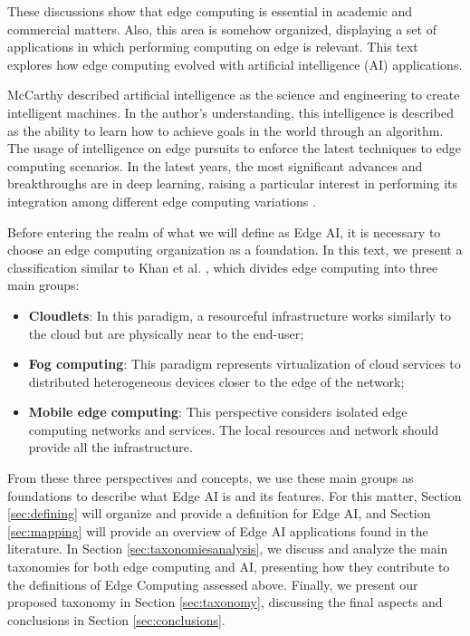 These discussions show that edge computing is essential in academic and commercial matters. Also, this area is somehow organized, displaying a set of applications in which performing computing on edge is relevant. This text explores how edge computing evolved with artificial intelligence (AI) applications. 

McCarthy \cite{mccarthy2007artificial} described artificial intelligence as the science and engineering to create intelligent machines. In the author's understanding, this intelligence is described as the ability to learn how to achieve goals in the world through an algorithm. The usage of intelligence on edge pursuits to enforce the latest techniques to edge computing scenarios. In the latest years, the most significant advances and breakthroughs are in deep learning, raising a particular interest in performing its integration among different edge computing variations \cite{deng2020edge}.

Before entering the realm of what we will define as Edge AI, it is necessary to choose an edge computing organization as a foundation. In this text, we present a classification similar to Khan et al. \cite{khan2019edge}, which divides edge computing into three main groups:

\begin{itemize}
    \item \textbf{Cloudlets}: In this paradigm, a resourceful infrastructure works similarly to the cloud but are physically near to the end-user;
    \item \textbf{Fog computing}: This paradigm represents virtualization of cloud services to distributed heterogeneous devices closer to the edge of the network;
    \item \textbf{Mobile edge computing}: This perspective considers isolated edge computing networks and services. The local resources and network should provide all the infrastructure.
\end{itemize}

From these three perspectives and concepts, we use these main groups as foundations to describe what Edge AI is and its features. For this matter, Section \ref{sec:defining} will organize and provide a definition for Edge AI, and Section \ref{sec:mapping} will provide an overview of Edge AI applications found in the literature. In Section \ref{sec:taxonomiesanalysis}, we discuss and analyze the main taxonomies for both edge computing and AI, presenting how they contribute to the definitions of Edge Computing assessed above. Finally, we present our proposed taxonomy in Section \ref{sec:taxonomy}, discussing the final aspects and conclusions in Section \ref{sec:conclusions}.

